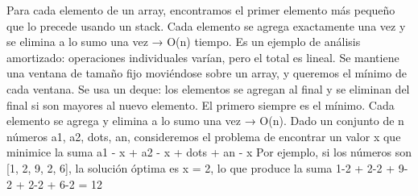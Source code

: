 {}Para cada elemento de un array, encontramos el primer elemento más pequeño que lo precede usando un stack.\markdownRendererParagraphSeparator
{}Cada elemento se agrega exactamente una vez y se elimina a lo sumo una vez → O(\markdownRendererDollarSign{}n\markdownRendererDollarSign{}) tiempo. Es un ejemplo de análisis amortizado: operaciones individuales varían, pero el total es lineal.\markdownRendererInterblockSeparator
{}\markdownRendererInterblockSeparator
{}
\markdownRendererSectionEnd \markdownRendererSectionBegin
{}\markdownRendererInterblockSeparator
{}Se mantiene una ventana de tamaño fijo moviéndose sobre un array, y queremos el mínimo de cada ventana.\markdownRendererParagraphSeparator
{}Se usa un deque: los elementos se agregan al final y se eliminan del final si son mayores al nuevo elemento. El primero siempre es el mínimo. Cada elemento se agrega y elimina a lo sumo una vez → O(\markdownRendererDollarSign{}n\markdownRendererDollarSign{}).\markdownRendererParagraphSeparator
{}\markdownRendererInterblockSeparator
{}
\markdownRendererSectionEnd \markdownRendererSectionBegin
{}\markdownRendererInterblockSeparator
{}Dado un conjunto de \markdownRendererDollarSign{}n\markdownRendererDollarSign{} números \markdownRendererDollarSign{}a\markdownRendererUnderscore{}1, a\markdownRendererUnderscore{}2, \markdownRendererBackslash{}dots, a\markdownRendererUnderscore{}n\markdownRendererDollarSign{}, consideremos el problema de encontrar un valor \markdownRendererDollarSign{}x\markdownRendererDollarSign{} que minimice la suma\markdownRendererParagraphSeparator
{}\markdownRendererDollarSign{}\markdownRendererDollarSign{}\markdownRendererPipe{}a\markdownRendererUnderscore{}1 - x\markdownRendererPipe{} + \markdownRendererPipe{}a\markdownRendererUnderscore{}2 - x\markdownRendererPipe{} + \markdownRendererBackslash{}dots + \markdownRendererPipe{}a\markdownRendererUnderscore{}n - x\markdownRendererPipe{}\markdownRendererDollarSign{}\markdownRendererDollarSign{}\markdownRendererParagraphSeparator
{}Por ejemplo, si los números son [1, 2, 9, 2, 6], la solución óptima es \markdownRendererDollarSign{}x = 2\markdownRendererDollarSign{}, lo que produce la suma\markdownRendererParagraphSeparator
{}\markdownRendererDollarSign{}\markdownRendererDollarSign{}\markdownRendererPipe{}1-2\markdownRendererPipe{} + \markdownRendererPipe{}2-2\markdownRendererPipe{} + \markdownRendererPipe{}9-2\markdownRendererPipe{} + \markdownRendererPipe{}2-2\markdownRendererPipe{} + \markdownRendererPipe{}6-2\markdownRendererPipe{} = 12\markdownRendererDollarSign{}\markdownRendererDollarSign{}\markdownRendererParagraphSeparator
